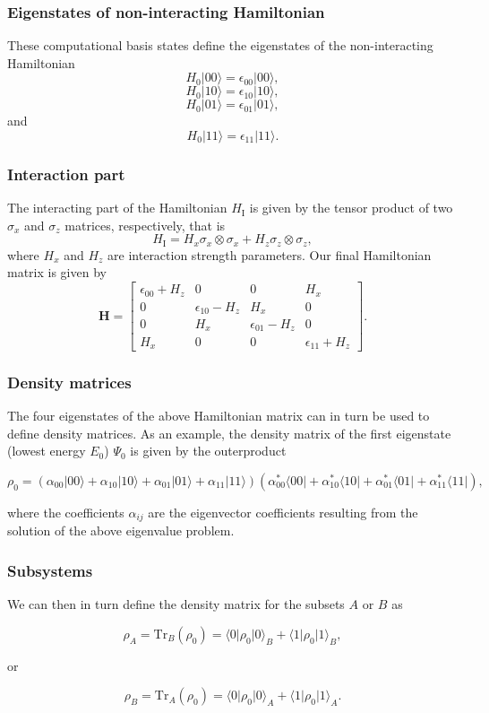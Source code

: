 \documentclass{beamer}
\begin{document}
\begin{frame}
\frametitle{Eigenstates of non-interacting Hamiltonian}

These computational basis states define the eigenstates of the non-interacting  Hamiltonian
\[
H_0\vert 00 \rangle = \epsilon_{00}\vert 00 \rangle,
\]
\[
H_0\vert 10 \rangle = \epsilon_{10}\vert 10 \rangle,
\]
\[
H_0\vert 01 \rangle = \epsilon_{01}\vert 01 \rangle,
\]
and
\[
H_0\vert 11 \rangle = \epsilon_{11}\vert 11 \rangle.
\]
\end{frame}

\begin{frame}
\frametitle{Interaction part}

The interacting part of the Hamiltonian $H_{\mathrm{I}}$ is given by the tensor product of two $\sigma_x$ and $\sigma_z$  matrices, respectively, that is
\[
H_{\mathrm{I}}=H_x\sigma_x\otimes\sigma_x+H_z\sigma_z\otimes\sigma_z,
\]
where $H_x$ and $H_z$ are interaction strength parameters. Our final Hamiltonian matrix is given by
\[
\bm{H}=\begin{bmatrix} \epsilon_{00}+H_z & 0 & 0 & H_x \\
                       0  & \epsilon_{10}-H_z & H_x & 0 \\
		       0 & H_x & \epsilon_{01}-H_z & 0 \\
		       H_x & 0 & 0 & \epsilon_{11} +H_z \end{bmatrix}.
\]
\end{frame}

\begin{frame}
\frametitle{Density matrices}

The four eigenstates of the above Hamiltonian matrix can in turn be used to
define density matrices. As an example, the density matrix of the
first eigenstate (lowest energy $E_0$) $\Psi_0$ is given by the outerproduct

\[
\rho_0=\left(\alpha_{00}\vert 00 \rangle+\alpha_{10}\vert 10 \rangle+\alpha_{01}\vert 01 \rangle+\alpha_{11}\vert 11 \rangle\right)\left(\alpha_{00}^*\langle 00\vert+\alpha_{10}^*\langle 10\vert+\alpha_{01}^*\langle 01\vert+\alpha_{11}^*\langle 11\vert\right),
\]

where the coefficients $\alpha_{ij}$ are the eigenvector coefficients
resulting from the solution of the above eigenvalue problem.
\end{frame}

\begin{frame}
\frametitle{Subsystems}

We can
then in turn define the density matrix for the subsets $A$ or $B$ as

\[
\rho_A=\mathrm{Tr}_B(\rho_{0})=\langle 0 \vert \rho_{0} \vert 0\rangle_{B}+\langle 1 \vert \rho_{0} \vert 1\rangle_{B},
\]

or

\[
\rho_B=\mathrm{Tr}_A(\rho_0)=\langle 0 \vert \rho_{0} \vert 0\rangle_{A}+\langle 1 \vert \rho_{0} \vert 1\rangle_{A}.
\]
\end{frame}
\end{document}
